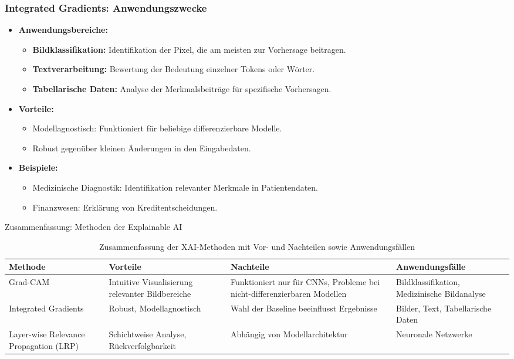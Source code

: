 \documentclass[aspectratio=1610, xcolor=dvipsnames, 9pt]{beamer}
\begin{document}
\begin{frame}
  \frametitle{Integrated Gradients: Anwendungszwecke}
  \begin{itemize}
    \item \textbf{Anwendungsbereiche:}
    \begin{itemize}
      \item \textbf{Bildklassifikation:} Identifikation der Pixel, die am meisten zur Vorhersage beitragen.
      \item \textbf{Textverarbeitung:} Bewertung der Bedeutung einzelner Tokens oder Wörter.
      \item \textbf{Tabellarische Daten:} Analyse der Merkmalsbeiträge für spezifische Vorhersagen.
    \end{itemize}
    \item \textbf{Vorteile:}
    \begin{itemize}
      \item Modellagnostisch: Funktioniert für beliebige differenzierbare Modelle.
      \item Robust gegenüber kleinen Änderungen in den Eingabedaten.
    \end{itemize}
    \item \textbf{Beispiele:}
    \begin{itemize}
      \item Medizinische Diagnostik: Identifikation relevanter Merkmale in Patientendaten.
      \item Finanzwesen: Erklärung von Kreditentscheidungen.
    \end{itemize}
  \end{itemize}
\end{frame}

\begin{frame}{Zusammenfassung: Methoden der Explainable AI}
  \begin{table}[]
    \centering
    \begin{tabular}{|p{2.5cm}|p{3.5cm}|p{3.5cm}|p{3.5cm}|}
      \hline
      \textbf{Methode} & \textbf{Vorteile} & \textbf{Nachteile} & \textbf{Anwendungsfälle} \\ \hline
      Grad-CAM & 
      Intuitive Visualisierung relevanter Bildbereiche & 
      Funktioniert nur für CNNs, Probleme bei nicht-differenzierbaren Modellen & 
      Bildklassifikation, Medizinische Bildanalyse \\ \hline
      Integrated Gradients & 
      Robust, Modellagnostisch & 
      Wahl der Baseline beeinflusst Ergebnisse & 
      Bilder, Text, Tabellarische Daten \\ \hline
      Layer-wise Relevance Propagation (LRP) & 
      Schichtweise Analyse, Rückverfolgbarkeit & 
      Abhängig von Modellarchitektur & 
      Neuronale Netzwerke \\ \hline
    \end{tabular}
    \caption{Zusammenfassung der XAI-Methoden mit Vor- und Nachteilen sowie Anwendungsfällen}
  \end{table}
\end{frame}
\end{document}
